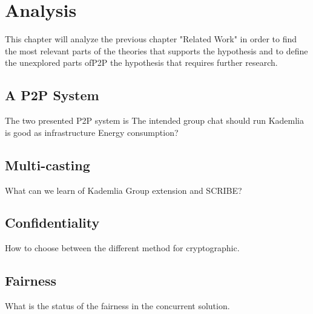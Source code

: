 \chapter{Analysis}
\label{cha:analysis}

\iffalse 
	This is where the author can answer the question of what use we can
	derive from all the works described in the previous chapter. Ideally,
	the summary of the related work will show that there is room
	unexplored for what the authors have in mind. If there are differences
	between the included works on key aspects in the approach to be taken,
	this is where this should be identified, and a decision reached.
	
	Having written the analysis, the author has all the tools needed to
	complete the next chapter.
\fi

This chapter will analyze the previous chapter "Related Work" in order to find the most relevant parts of the theories that supports the hypothesis and to define the unexplored parts ofP2P the hypothesis that requires further research.

\section{A P2P System}
The two presented P2P system is 
The intended group chat should run 
	Kademlia is good as infrastructure
	Energy consumption?
\section{Multi-casting}
	What can we learn of Kademlia Group extension and SCRIBE?
\section{Confidentiality}
	How to choose between the different method for cryptographic.
\section{Fairness}
	What is the status of the fairness in the concurrent solution.
		